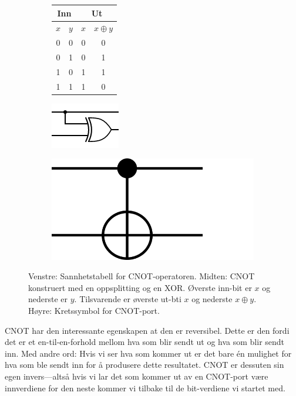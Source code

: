 \begin{center}
\begin{figure}[h]
\begin{subfigure}{.3\textwidth}
	\begin{tabular}{|c|c||c|c|}
		\hline
	\multicolumn{2}{|c||}{Inn} & \multicolumn{2}{|c|}{Ut} \\
	\hline
	\hline
	$x$ & $y$ & $x$ & $x\oplus y$ \\
	\hline
	\hline
	0 & 0 & 0 & 0 \\
	0 & 1 & 0 & 1 \\
	1 & 0 & 1 & 1 \\
	1 & 1 & 1 & 0 \\
	\hline
	\end{tabular}
\end{subfigure}
\begin{subfigure}{.3\textwidth}
	\includegraphics{./gate_cnot_comp}
\end{subfigure}
\begin{subfigure}{.3\textwidth}
	\includegraphics{./gate_cnot}
\end{subfigure}
\caption{Venstre: Sannhetstabell for CNOT-operatoren. Midten: CNOT konstruert med en oppsplitting og en XOR. Øverste inn-bit er $x$ og nederste er $y$. Tilsvarende er øverste ut-bti $x$ og nederste $x\oplus y$. Høyre: Kretssymbol for CNOT-port.}
\end{figure}
\end{center}

CNOT har den interessante egenskapen at den er reversibel. Dette er den fordi det er et en-til-en-forhold mellom hva som blir sendt ut og hva som blir sendt inn. Med andre ord: Hvis vi ser hva som kommer ut er det bare \'en mulighet for hva som ble sendt inn for å produsere dette resultatet. CNOT er dessuten sin egen invers---altså hvis vi lar det som kommer ut av en CNOT-port være innverdiene for den neste kommer vi tilbake til de bit-verdiene vi startet med.

